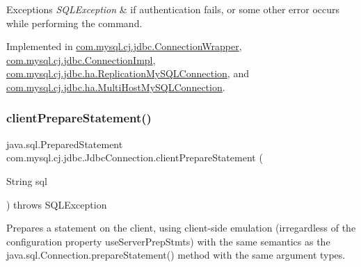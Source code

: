 \begin{DoxyExceptions}{Exceptions}
{\em S\+Q\+L\+Exception} & if authentication fails, or some other error occurs while performing the command. \\
\hline
\end{DoxyExceptions}


Implemented in \mbox{\hyperlink{classcom_1_1mysql_1_1cj_1_1jdbc_1_1_connection_wrapper_a326d50e31598342bcc2c4273967f3020}{com.\+mysql.\+cj.\+jdbc.\+Connection\+Wrapper}}, \mbox{\hyperlink{classcom_1_1mysql_1_1cj_1_1jdbc_1_1_connection_impl_a124604d3aae705d3e14bc1deb6a3f9a9}{com.\+mysql.\+cj.\+jdbc.\+Connection\+Impl}}, \mbox{\hyperlink{classcom_1_1mysql_1_1cj_1_1jdbc_1_1ha_1_1_replication_my_s_q_l_connection_a42cf4364f5721814b388fa7bef9fb009}{com.\+mysql.\+cj.\+jdbc.\+ha.\+Replication\+My\+S\+Q\+L\+Connection}}, and \mbox{\hyperlink{classcom_1_1mysql_1_1cj_1_1jdbc_1_1ha_1_1_multi_host_my_s_q_l_connection_a12c407fe2d10ba1f27cae220289f8adf}{com.\+mysql.\+cj.\+jdbc.\+ha.\+Multi\+Host\+My\+S\+Q\+L\+Connection}}.

\mbox{\label{interfacecom_1_1mysql_1_1cj_1_1jdbc_1_1_jdbc_connection_a62db1ccf7a070833775481acb5e9e359}} 
\subsubsection{\texorpdfstring{client\+Prepare\+Statement()}{clientPrepareStatement()}\hspace{0.1cm}{\footnotesize\ttfamily [1/6]}}
{\footnotesize\ttfamily java.\+sql.\+Prepared\+Statement com.\+mysql.\+cj.\+jdbc.\+Jdbc\+Connection.\+client\+Prepare\+Statement (\begin{DoxyParamCaption}\item[{String}]{sql }\end{DoxyParamCaption}) throws S\+Q\+L\+Exception}

Prepares a statement on the client, using client-\/side emulation (irregardless of the configuration property \textquotesingle{}use\+Server\+Prep\+Stmts\textquotesingle{}) with the same semantics as the java.\+sql.\+Connection.\+prepare\+Statement() method with the same argument types.


